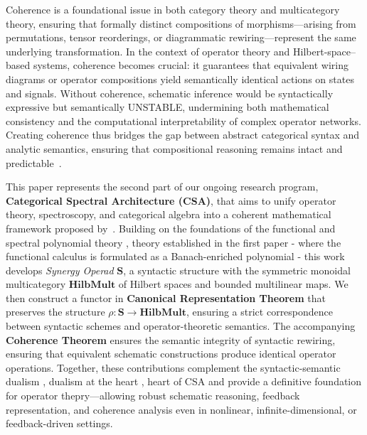 \documentclass[11pt]{article}
\begin{document}
Coherence is a foundational issue in both category theory and multicategory theory, ensuring that formally distinct compositions of morphisms—arising from permutations, tensor reorderings, or diagrammatic rewiring—represent the same underlying transformation. In the context of operator theory and Hilbert-space–based systems, coherence becomes crucial: it guarantees that equivalent wiring diagrams or operator compositions yield semantically identical actions on states and signals. Without coherence, schematic inference would be syntactically expressive but semantically UNSTABLE, undermining both mathematical consistency and the computational interpretability of complex operator networks. Creating coherence thus bridges the gap between abstract categorical syntax and analytic semantics, ensuring that compositional reasoning remains intact and predictable~\cite{awodey2010category}.


This paper represents the second part of our ongoing research program, \textbf{Categorical Spectral Architecture (CSA)}, that aims to unify operator theory, spectroscopy, and categorical algebra into a coherent mathematical framework proposed by~\cite{Chang2025HilbMultABranchE}. Building on the foundations of the functional and spectral polynomial theory , theory established in the first paper - where the functional calculus is formulated as a Banach-enriched polynomial - this work develops \emph{Synergy Operad} $\mathbf{S}$, a syntactic structure with the symmetric monoidal multicategory $\mathbf{HilbMult}$ of Hilbert spaces and bounded multilinear maps. We then construct a functor in \textbf{Canonical Representation Theorem} that preserves the structure $\rho: \mathbf{S} \to \mathbf{HilbMult}$, ensuring a strict correspondence between syntactic schemes and operator-theoretic semantics. The accompanying \textbf{Coherence Theorem} ensures the semantic integrity of syntactic rewiring, ensuring that equivalent schematic constructions produce identical operator operations. Together, these contributions complement the syntactic-semantic dualism , dualism at the heart , heart of CSA and provide a definitive foundation for operator thepry—allowing robust schematic reasoning, feedback representation, and coherence analysis even in nonlinear, infinite-dimensional, or feedback-driven settings.
\end{document}
